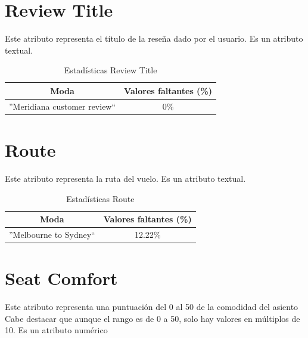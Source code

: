 \documentclass[12pt]{report} %
\begin{document}
    \section{Review Title}

    Este atributo representa el título de la reseña dado por el usuario. Es un atributo
    textual.

    \begin{table}[H]
        \begin{center}
            \begin{tabular}{ @{}cc@{} }
                \toprule
                Moda & Valores faltantes (\%) \\
                \midrule
                ''Meridiana customer review`` & 0\% \\
                \bottomrule
            \end{tabular}
            \caption{Estadísticas Review Title}
        \end{center}
    \end{table}

    \section{Route}

    Este atributo representa la ruta del vuelo. Es un atributo textual.

    \begin{table}[H]
        \begin{center}
            \begin{tabular}{ @{}cc@{} }
                \toprule
                Moda & Valores faltantes (\%) \\
                \midrule
                ''Melbourne to Sydney`` & 12.22\% \\
                \bottomrule
            \end{tabular}
            \caption{Estadísticas Route}
        \end{center}
    \end{table}

    \section{Seat Comfort}

    Este atributo representa una puntuación del 0 al 50 de la comodidad del asiento
    Cabe destacar que aunque el rango es de 0 a 50, solo hay valores en múltiplos de 10.
    Es un atributo numérico
\end{document}
